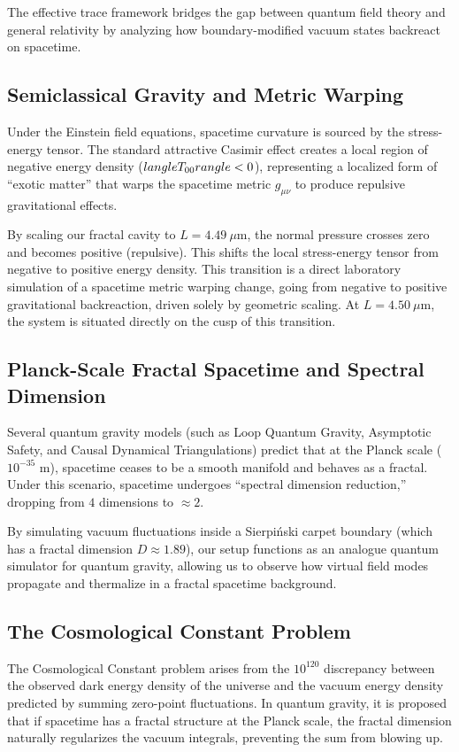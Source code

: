 \documentclass[12pt,letterpaper]{article}
\begin{document}
The effective trace framework bridges the gap between quantum field theory and general relativity by analyzing how boundary-modified vacuum states backreact on spacetime.

\subsection{Semiclassical Gravity and Metric Warping}
Under the Einstein field equations, spacetime curvature is sourced by the stress-energy tensor. The standard attractive Casimir effect creates a local region of negative energy density ($\\langle T_{00} \\rangle < 0$), representing a localized form of ``exotic matter'' that warps the spacetime metric $g_{\mu\nu}$ to produce repulsive gravitational effects. 

By scaling our fractal cavity to $L = 4.49\ \mu\text{m}$, the normal pressure crosses zero and becomes positive (repulsive). This shifts the local stress-energy tensor from negative to positive energy density. This transition is a direct laboratory simulation of a spacetime metric warping change, going from negative to positive gravitational backreaction, driven solely by geometric scaling. At $L = 4.50\ \mu\text{m}$, the system is situated directly on the cusp of this transition.

\subsection{Planck-Scale Fractal Spacetime and Spectral Dimension}
Several quantum gravity models (such as Loop Quantum Gravity, Asymptotic Safety, and Causal Dynamical Triangulations) predict that at the Planck scale ($10^{-35}$ m), spacetime ceases to be a smooth manifold and behaves as a fractal. Under this scenario, spacetime undergoes ``spectral dimension reduction,'' dropping from $4$ dimensions to $\approx 2$.

By simulating vacuum fluctuations inside a Sierpi\'nski carpet boundary (which has a fractal dimension $D \approx 1.89$), our setup functions as an analogue quantum simulator for quantum gravity, allowing us to observe how virtual field modes propagate and thermalize in a fractal spacetime background.

\subsection{The Cosmological Constant Problem}
The Cosmological Constant problem arises from the $10^{120}$ discrepancy between the observed dark energy density of the universe and the vacuum energy density predicted by summing zero-point fluctuations. In quantum gravity, it is proposed that if spacetime has a fractal structure at the Planck scale, the fractal dimension naturally regularizes the vacuum integrals, preventing the sum from blowing up.
\end{document}
